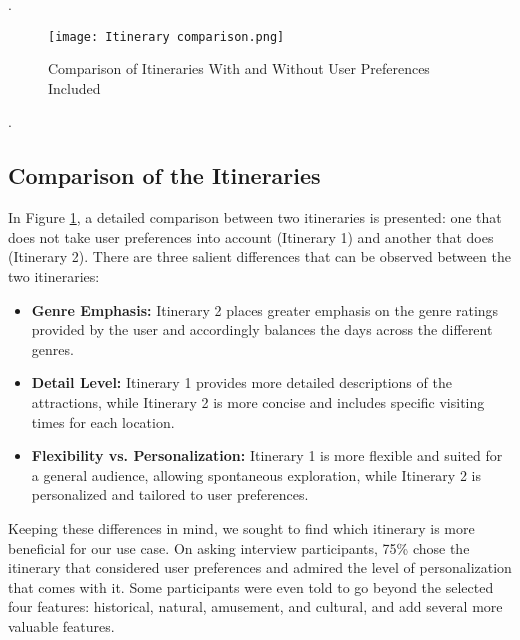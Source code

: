 \documentclass[sigconf,authordraft]{acmart}
\begin{document}
    \newpage
    .
    \newpage

    \begin{figure}[H]
        \centering
        \texttt{[image: Itinerary comparison.png]} %
        \caption{Comparison of Itineraries With and Without User Preferences Included}
        \label{fig:itinerary_comparison}
    \end{figure}

    \newpage
    .
    \newpage

  \subsection{Comparison of the Itineraries}

    In Figure \ref{fig:itinerary_comparison}, a detailed comparison between two itineraries is presented: one that does not take user preferences into account (Itinerary 1) and another that does (Itinerary 2). There are three salient differences that can be observed between the two itineraries:

    \begin{itemize}
    \item \textbf{Genre Emphasis:} Itinerary 2 places greater emphasis on the genre ratings provided by the user and accordingly balances the days across the different genres.

    \item \textbf{Detail Level:} Itinerary 1 provides more detailed descriptions of the attractions, while Itinerary 2 is more concise and includes specific visiting times for each location.

    \item \textbf{Flexibility vs. Personalization:} Itinerary 1 is more flexible and suited for a general audience, allowing spontaneous exploration, while Itinerary 2 is personalized and tailored to user preferences.
    \end{itemize}

    Keeping these differences in mind, we sought to find which itinerary is more beneficial for our use case. On asking interview participants, 75\% chose the itinerary that considered user preferences and admired the level of personalization that comes with it. Some participants were even told to go beyond the selected four features: historical, natural, amusement, and cultural, and add several more valuable features.
    \newpage

% 
% 
\end{document}
